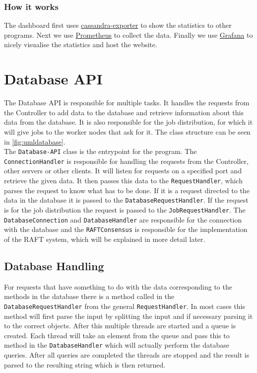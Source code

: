 \documentclass[../Main.tex]{subfiles}
\begin{document}
\subsubsection{How it works}
The dashboard first uses \href{https://github.com/instaclustr/cassandra-exporter}{cassandra-exporter} to show the statistics to other programs. Next we use \href{https://prometheus.io/}{Prometheus} to collect the data. Finally we use \href{https://grafana.com/}{Grafana} to nicely visualise the statistics and host the website.

\section{Database API}
The Database API is responsible for multiple tasks. It handles the requests from the Controller to add data to the database and retrieve information about this data from the database. It is also responsible for the job distribution, for which it will give jobs to the worker nodes that ask for it. The class structure can be seen in \cref{fig:umldatabase}.\\

The \texttt{Database-API} class is the entrypoint for the program. The \texttt{ConnectionHandler} is responsible for handling the requests from the Controller, other servers or other clients. It will listen for requests on a specified port and retrieve the given data. It then passes this data to the \texttt{RequestHandler}, which parses the request to know what has to be done. If it is a request directed to the data in the database it is passed to the \texttt{DatabaseRequestHandler}. If the request is for the job distribution the request is passed to the \texttt{JobRequestHandler}. The \texttt{DatabaseConnection} and \texttt{DatabaseHandler} are responsible for the connection with the database and the \texttt{RAFTConsensus} is responsible for the implementation of the RAFT system, which will be explained in more detail later.

\subsection{Database Handling}
For requests that have something to do with the data corresponding to the methods in the database there is a method called in the \texttt{DatabaseRequestHandler} from the general \texttt{RequestHandler}. In most cases this method will first parse the input by splitting the input and if necessary parsing it to the correct objects. After this multiple threads are started and a queue is created. Each thread will take an element from the queue and pass this to method in the \texttt{DatabaseHandler} which will actually perform the database queries. After all queries are completed the threads are stopped and the result is parsed to the resulting string which is then returned.\\
\end{document}
